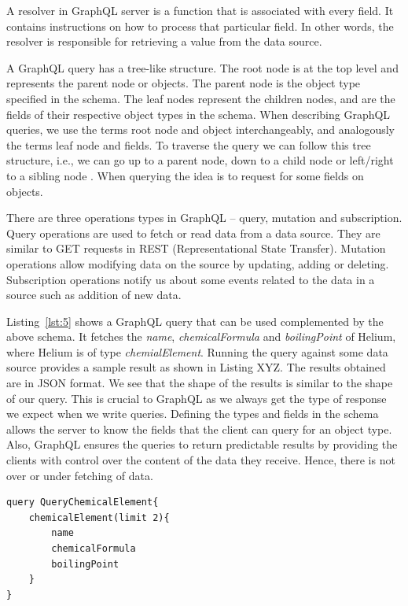 A resolver in GraphQL server is a function that is associated with every field. It contains instructions on how to process that particular field. In other words, the resolver is responsible for retrieving a value from the data source.
 
A GraphQL query has a tree-like structure. The root node is at the top level and represents the parent node or objects. The parent node is the object type specified in the schema. The leaf nodes represent the children nodes, and are the fields of their respective object types in the schema. When describing GraphQL queries, we use the terms root node and object interchangeably, and analogously the terms leaf node and fields. To traverse the query we can follow this tree structure, i.e., we can go up to a parent node, down to a child node or left/right to a sibling node \cite{Perez2009}. When querying the idea is to request for some fields on objects.

There are three operations types in GraphQL – query, mutation and subscription. Query operations are used to fetch or read data from a data source. They are similar to GET requests in REST (Representational State Transfer). Mutation operations allow modifying data on the source by updating, adding or deleting. Subscription operations notify us about some events related to the data in a source such as addition of new data.

Listing~\ref{lst:5} shows a GraphQL query that can be used complemented by the above schema. It fetches the \textit{name}, \textit{chemicalFormula} and \textit{boilingPoint} of Helium, where Helium is of type \textit{chemialElement}. Running the query against some data source provides a sample result as shown in Listing XYZ. The results obtained are in JSON format. We see that the shape of the results is similar to the shape of our query. This is crucial to GraphQL as we always get the type of response we expect when we write queries. Defining the types and fields in the schema allows the server to know the fields that the client can query for an object type. Also, GraphQL ensures the queries to return predictable results by providing the clients with control over the content of the data they receive. Hence, there is not over or under fetching of data.

\begin{minipage}{\linewidth}
\begin{lstlisting}[label=lst:5, caption={GraphQL Query to fetch chemical elements and their properties}]
query QueryChemicalElement{
	chemicalElement(limit 2){
		name
		chemicalFormula
		boilingPoint
	}
}
\end{lstlisting}
\end{minipage}

